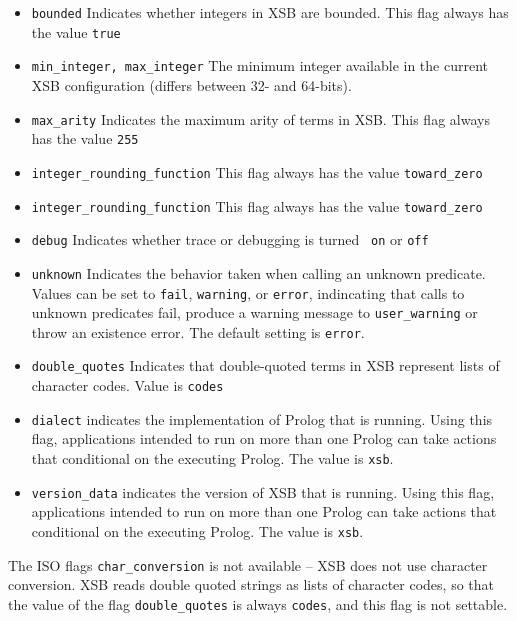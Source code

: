 \begin{description}
\begin{itemize}
\item {\tt bounded} Indicates whether integers in XSB are bounded.
  This flag always has the value {\tt true}
%
\item {\tt min\_integer, max\_integer} The minimum integer available in the current
  XSB configuration (differs between 32- and 64-bits).
%
\item {\tt max\_arity} Indicates the maximum arity of terms in XSB.
  This flag always has the value {\tt 255}
%
\item {\tt integer\_rounding\_function} This flag always has the value
  {\tt toward\_zero}
%
\item {\tt integer\_rounding\_function} This flag always has the value
  {\tt toward\_zero}
%
\item {\tt debug} Indicates whether trace or debugging is turned {\tt
  on} or {\tt off}
%
\item {\tt unknown} Indicates the behavior taken when calling an
  unknown predicate.  Values can be set to {\tt fail}, {\tt warning},
  or {\tt error}, indincating that calls to unknown predicates fail,
  produce a warning message to {\tt user\_warning} or throw an
  existence error.  The default setting is {\tt error}.
%
\item {\tt double\_quotes} Indicates that double-quoted terms in XSB
  represent lists of character codes.  Value is {\tt codes}
%
\item {\tt dialect} indicates the implementation of Prolog that is
  running.  Using this flag, applications intended to run on more than
  one Prolog can take actions that conditional on the executing
  Prolog.  The value is {\tt xsb}.

\item {\tt version\_data} indicates the version of XSB that is
  running.  Using this flag, applications intended to run on more than
  one Prolog can take actions that conditional on the executing
  Prolog.  The value is {\tt xsb}.
\end{itemize}

\compatability The ISO flags {\tt char\_conversion} is not available
-- XSB does not use character conversion.  XSB reads double quoted
strings as lists of character codes, so that the value of the flag
{\tt double\_quotes} is always {\tt codes}, and this flag is not
settable.


\end{description}
